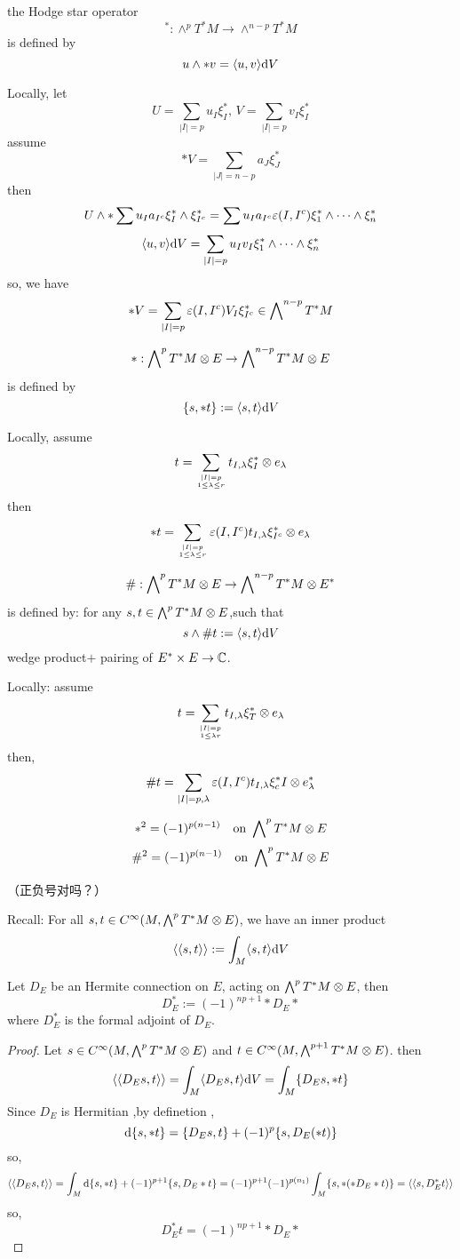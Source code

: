 \begin{definition}
the Hodge star operator
$$^*:\wedge^pT^*M\to\wedge^{n-p}T^*M$$
is defined by
$$u\wedge*v=\langle u,v\rangle\mathrm{d} V$$
\end{definition}
Locally, let
$$U=\sum_{|I|=p}u_I\xi_I^*,\,V=\sum_{|I|=p}v_I\xi_I^*$$
assume
$$*V=\sum_{|J|=n-p}a_J\xi_J^*$$
then
$$U\wedge*\sum u_I a_{I^c}\xi_I^*\wedge\xi_{I^c}^*
=\sum u_Ia_{I^c}\varepsilon(I,I^c)\xi_1^*\wedge\cdots\wedge\xi_n^*
$$
$$
  \langle u,v\rangle\mathrm{d} V=\sum_{|I|=p}u_Iv_I\xi_1^*\wedge\cdots\wedge\xi_n^*
$$
so, we have
$$
  *V=\sum_{|I|=p}\varepsilon(I,I^c)V_I\xi_{I^c}^*
\in \bigwedge\nolimits^{n-p}T^*M
$$

\begin{definition}
$$*:\bigwedge\nolimits^{p}T^*M\otimes E\to\bigwedge\nolimits^{n-p}T^*M\otimes E$$
is defined by
$$\{s,*t\}:=\langle s,t\rangle\mathrm{d} V$$
\end{definition}

Locally, assume
$$t=\sum_{|I|=p\atop1\leq\lambda\leq r}
t_{I,\lambda}\xi_I^*\otimes e_{\lambda}
$$
then
$$
  *t=
  \sum_{|I|=p\atop 1\leq\lambda\leq r}
  \varepsilon(I,I^c)
  t_{I,\lambda}\xi_{I^c}^*\otimes e_{\lambda}
$$

\begin{definition}
$$\#:\bigwedge\nolimits^{p}T^*M\otimes E\to\bigwedge\nolimits^{n-p}T^*M\otimes E^*$$
is defined by: for any $s,t\in \bigwedge\nolimits^{p}T^*M\otimes E$,such that
$$s\wedge\# t:=\langle s,t\rangle\mathrm{d} V$$
wedge product$+$ pairing of $E^*\times E\to\mathbb{C}$.
\end{definition}
Locally: assume
$$t=\sum_{|I|=p\atop 1\leq\lambda r}
t_{I,\lambda}\xi_T^*\otimes e_{\lambda}
$$
then,
$$\#t=\sum_{|I|=p,\lambda}
\varepsilon(I,I^c)t_{I,\lambda}\xi_c^*I\otimes e_\lambda^*
$$

\begin{prop}
$$*^2=(-1)^{p(n-1)}\quad\text{on } \bigwedge\nolimits^{p}T^*M\otimes E$$
$$\#^2=(-1)^{p(n-1)}\quad\text{on } \bigwedge\nolimits^{p}T^*M\otimes E$$
\end{prop}
（正负号对吗？）

Recall: For all $s,t\in C^\infty(M,\bigwedge\nolimits^{p}T^*M\otimes E)$,
we have an inner product
$$\langle\langle s,t\rangle\rangle
:=\int_M\langle s,t\rangle\mathrm{d} V
$$

\begin{thm}
Let $D_E$ be an Hermite connection on $E$,
acting on $\bigwedge\nolimits^{p}T^*M\otimes E$, then
$$D_E^*:=(-1)^{np+1}*D_E*$$
where $D^*_E$ is the formal adjoint of $D_E$.
\end{thm}

\begin{proof}
Let $s\in C^\infty(M,\bigwedge\nolimits^{p}T^*M\otimes E)$ and
$t\in C^\infty(M,\bigwedge\nolimits^{p+1}T^*M\otimes E)$. then
$$
  \langle\langle D_Es,t\rangle\rangle
 =\int_M
    \langle
      D_Es,t
    \rangle
    \mathrm{d} V
 =
  \int_M
    \{D_Es,*t\}
$$
Since $D_E$ is Hermitian ,by definetion ,
$$\mathrm{d}\{s,*t\}=\{D_Es,t\}+(-1)^p\{s,D_E(*t)\}$$
so,
$$
  \langle\langle D_Es,t\rangle\rangle
=
  \int_M\mathrm{d}\{s,*t\}
  +(-1)^{p+1}
   \{s,D_E*t\}
=
  (-1)^{p+1}(-1)^{p(n_1)}
  \int_M
    \{s,*(*D_E*t)\}
=
  \langle\langle s,D_E^*t\rangle\rangle
$$
so,
$$D_E^*t=(-1)^{np+1}*D_E*$$
\end{proof}

